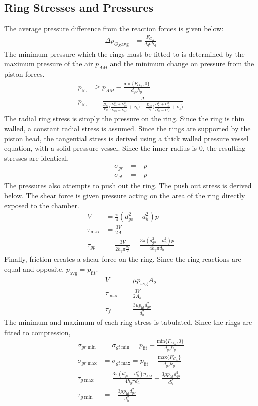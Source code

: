 \documentclass[10pt,a4paper]{article}
\begin{document}
	\subsection*{Ring Stresses and Pressures}
	The average pressure difference from the reaction forces is given below:
	\begin{align}
	 \Delta p_{G_X \text{avg}} &= \frac{F_{G_X}}{d_go h_g}
	\end{align}
	The minimum pressure which the rings must be fitted to is determined by the maximum pressure of the air $p_{AM}$ and the minimum change on pressure from the piston forces.
	\begin{align}
	p_{\text{fit}} &\geq p_{AM} - \frac{\text{min} \{ F_{G_X}, 0 \}}{d_{go} h_g}\\
	p_{\text{fit}} &= \frac{\Delta}{\frac{D_{hi}}{E_h} \Big( \frac{D_{ho}^2+D_{hi}^2}{D_{ho}^2-D_{hi}^2} + \nu_h \big) +\frac{D_{so}}{E_h} \Big( \frac{D_{so}^2+D_{si}^2}{D_{so}^2-D_{si}^2} + \nu_s \big) }
	\end{align}
	The radial ring stress is simply the pressure on the ring. Since the ring is thin walled, a constant radial stress is assumed.
	Since the rings are supported by the piston head, the tangential stress is derived using a thick walled pressure vessel equation, with a solid pressure vessel. Since the inner radius is 0, the resulting stresses are identical.
	\begin{align}
		\sigma_{gr} &= -p\\
		\sigma_{gt} &= -p
	\end{align}
	The pressures also attempts to push out the ring. The push out stress is derived below. The shear force is given pressure acting on the area of the ring directly exposed to the chamber.
	\begin{align}
	 V &= \frac{\pi}{4}(d_{go}^2-d_{h}^2) p\\
	 \tau_{\text{max}} &= \frac{3V}{2A} \\
	 \tau_{gp} &= \frac{3V}{2 h_g \pi \frac{d_h}{2} } = \frac{3 \pi (d_{go}^2-d_{h}^2) p}{4 h_g \pi d_h} 
	\end{align}
	Finally, friction creates a shear force on the ring. Since the ring reactions are equal and opposite, $p_{\text{avg}} = p_{\text{fit}}$.
	\begin{align}
		V &=  \mu p_{\text{avg}} A_o \\
		\tau_{\text{max}} &= \frac{3V}{2A_h} \\
		\tau_{f} &= \frac{3 \mu p_{\text{fit}} d_{go}^2}{d_h^2} 
	\end{align}
	The minimum and maximum of each ring stress is tabulated. Since the rings are fitted to compression, 
	\begin{align}
		\sigma_{gr\ \text{min}} &= \sigma_{gt\ \text{min}} = p_{\text{fit}} + \frac{\text{min} \{ F_{G_X}, 0 \}}{d_{go} h_g}\\
		\sigma_{gr\ \text{max}} &= \sigma_{gt\ \text{max}} = p_{\text{fit}} + \frac{\text{max} \{ F_{G_X}\}}{d_{go} h_g}\\
		\tau_{g\ \text{max}} &= \frac{3 \pi (d_{go}^2-d_{h}^2) p_{AM}}{4 h_g \pi d_h} - \frac{3 \mu p_{\text{fit}} d_{go}^2}{d_h^2}\\
		\tau_{g\  \text{min}} &= -\frac{3 \mu p_{\text{fit}} d_{go}^2}{d_h^2}
	\end{align}
\end{document}
